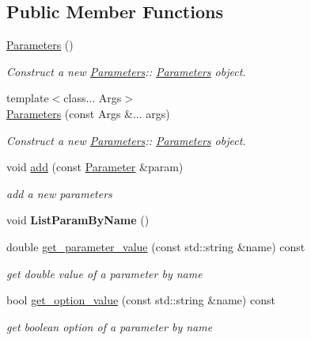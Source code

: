 \subsection*{Public Member Functions}
\begin{DoxyCompactItemize}
\item 
\mbox{\label{classParameters_af4d94ee360ac0157d9065f78797fe9a1}} 
\hyperlink{classParameters_af4d94ee360ac0157d9065f78797fe9a1}{Parameters} ()
\begin{DoxyCompactList}\small\item\em Construct a new \hyperlink{classParameters}{Parameters}\+:\+: \hyperlink{classParameters}{Parameters} object. \end{DoxyCompactList}\item 
{\footnotesize template$<$class... Args$>$ }\\\hyperlink{classParameters_ad6dd615ae7b15ad277796f0ea5d15442}{Parameters} (const Args \&... args)
\begin{DoxyCompactList}\small\item\em Construct a new \hyperlink{classParameters}{Parameters}\+:\+: \hyperlink{classParameters}{Parameters} object. \end{DoxyCompactList}\item 
void \hyperlink{classParameters_a0e846d18b12895afa22311f4b597ff90}{add} (const \hyperlink{classParameter}{Parameter} \&param)
\begin{DoxyCompactList}\small\item\em add a new parameters \end{DoxyCompactList}\item 
\mbox{\label{classParameters_a54c52e1c269e995779f16f33f4c68db0}} 
void {\bfseries List\+Param\+By\+Name} ()
\item 
double \hyperlink{classParameters_ab1bac6bf07b9698c850542b68e143ef3}{get\+\_\+parameter\+\_\+value} (const std\+::string \&name) const
\begin{DoxyCompactList}\small\item\em get double value of a parameter by name \end{DoxyCompactList}\item 
bool \hyperlink{classParameters_a33402b196d17c9f3816f9c889b87c540}{get\+\_\+option\+\_\+value} (const std\+::string \&name) const
\begin{DoxyCompactList}\small\item\em get boolean option of a parameter by name \end{DoxyCompactList}\item 

\end{DoxyCompactItemize}

